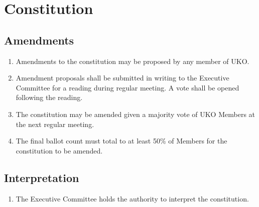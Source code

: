 \documentclass[12pt,executivepaper]{article}
\begin{document}
\section{Constitution}

\subsection{Amendments}
\begin{enumerate}
    \item Amendments to the constitution may be proposed by any member of UKO.
    \item Amendment proposals shall be submitted in writing to the Executive
          Committee for a reading during regular meeting. A vote shall be
          opened following the reading.
    \item The constitution may be amended given a majority vote of UKO Members
          at the next regular meeting.
    \item The final ballot count must total to at least 50\% of Members for the
          constitution to be amended.
\end{enumerate}

\subsection{Interpretation}
\begin{enumerate}
    \item The Executive Committee holds the authority to interpret the constitution.
\end{enumerate}
\end{document}
